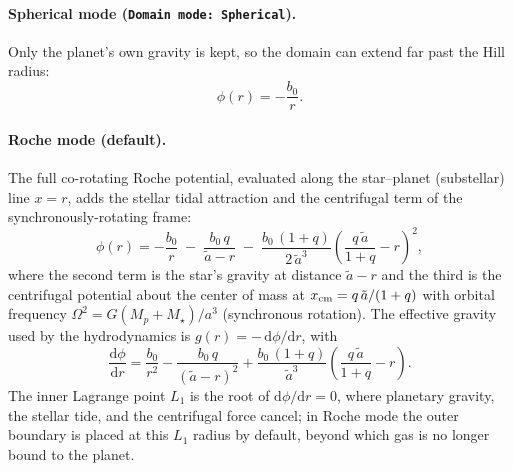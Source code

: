 \documentclass[english,a4paper]{my_memo}
\begin{document}
\paragraph{Spherical mode (\texttt{Domain mode: Spherical}).}
Only the planet's own gravity is kept, so the domain can extend far past the Hill
radius:
\[
\phi(r) = -\frac{b_0}{r}.
\]

\paragraph{Roche mode (default).}
The full co-rotating Roche potential, evaluated along the star--planet
(substellar) line $x=r$, adds the stellar tidal attraction and the centrifugal
term of the synchronously-rotating frame:
\[
\phi(r) = -\frac{b_0}{r}
          \;-\;\frac{b_0\,q}{\tilde a - r}
          \;-\;\frac{b_0\,(1+q)}{2\,\tilde a^{3}}
                \left(\frac{q\,\tilde a}{1+q} - r\right)^{2},
\]
where the second term is the star's gravity at distance $\tilde a-r$ and the
third is the centrifugal potential about the center of mass at
$x_{\rm cm}=q\,\tilde a/(1+q)$ with orbital frequency $\Omega^2=G(M_p+M_\star)/a^3$
(synchronous rotation). The effective gravity used by the hydrodynamics is
$g(r)=-\,\mathrm d\phi/\mathrm dr$, with
\[
\frac{\mathrm d\phi}{\mathrm dr} = \frac{b_0}{r^2}
   - \frac{b_0\,q}{(\tilde a-r)^2}
   + \frac{b_0\,(1+q)}{\tilde a^{3}}\left(\frac{q\,\tilde a}{1+q}-r\right).
\]
The inner Lagrange point $L_1$ is the root of $\mathrm d\phi/\mathrm dr=0$, where
planetary gravity, the stellar tide, and the centrifugal force cancel; in Roche
mode the outer boundary is placed at this $L_1$ radius by default, beyond which
gas is no longer bound to the planet.
\end{document}
